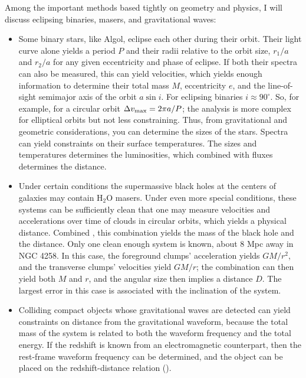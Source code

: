 Among the important methods based tightly on geometry and physics, I
will discuss eclipsing binaries, masers, and gravitational waves:
\begin{itemize}
\item Some binary stars, like Algol, eclipse each other during their
orbit. Their light curve alone yields a period $P$ and their radii
relative to the orbit size, $r_1/a$ and $r_2/a$ for any given
eccentricity and phase of eclipse. If both their spectra can also be
measured, this can yield velocities, which yields enough information
to determine their total mass $M$, eccentricity $e$, and the
line-of-sight semimajor axis of the orbit $a \sin i$. For eclipsing
binaries $i\approx 90^\circ$. So, for example, for a circular orbit
$\Delta v_{\rm max} = 2\pi a / P$; the analysis is more complex for
elliptical orbits but not less constraining.  Thus, from gravitational
and geometric considerations, you can determine the sizes of the
stars. Spectra can yield constraints on their surface
temperatures. The sizes and temperatures determines the luminosities,
which combined with fluxes determines the distance.
\item Under certain conditions the supermassive
black holes at the centers of galaxies may contain H$_2$O
masers. Under even more special conditions, these systems can be
sufficiently clean that one may measure velocities and accelerations
over time of clouds in circular orbits, which yields a physical
distance. Combined , this combination yields the mass of the black
hole and the distance. Only one clean enough system is known, about 8
Mpc away in NGC 4258. In this case, the foreground clumps'
acceleration yields $GM/r^2$, and the transverse clumps' velocities
yield $GM/r$; the combination can then yield both $M$ and $r$, and the
angular size then implies a distance $D$. The largest error in this
case is associated with the inclination of the system.
\item Colliding compact objects whose gravitational waves are detected can
yield constraints on distance from the gravitational waveform, because
the total mass of the system is related to both the waveform frequency
and the total energy. If the redshift is known from an electromagnetic
counterpart, then the rest-frame waveform frequency can be determined,
and the object can be placed on the redshift-distance relation
(\citealt{holz18a}).
\end{itemize}

